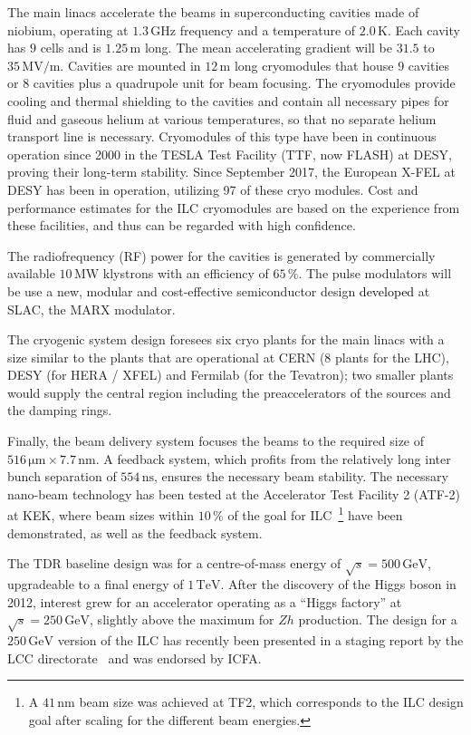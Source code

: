 \documentclass[%
 reprint,
 amsmath,amssymb,
 aps,
]{revtex4-1}
\newcommand{\jim}[1]{\textcolor{black}{#1}}
\begin{document}
The main linacs accelerate the beams in superconducting cavities made of niobium, operating at $1.3\,{\mathrm{GHz}}$ frequency and a temperature of $2.0\,{\mathrm{K}}$. 
Each cavity has $9$ cells and is $1.25\,{\mathrm{m}}$ long. The mean accelerating gradient will be $31.5$ to $35\,{\mathrm{MV/m}}$.
Cavities are mounted in $12\,{\mathrm{m}}$ long cryomodules that house $9$ cavities or $8$ cavities plus a quadrupole unit for beam focusing. 
The cryomodules provide cooling and thermal shielding to the cavities and contain all necessary pipes for fluid and gaseous helium at various temperatures, so that no separate helium transport line is necessary.
Cryomodules of this type have been in continuous operation since 2000 in the TESLA Test Facility (TTF, now FLASH) at DESY,  proving their long-term stability. 
Since September 2017, the European X-FEL at DESY has been in operation, utilizing 97 of these cryo modules. 
Cost and performance estimates for the ILC cryomodules are based on the experience from these facilities, and thus can be regarded with high confidence. 

The radiofrequency (RF) power for the cavities is generated by commercially available $10\,{\mathrm{MW}}$ klystrons with an efficiency of $65\,\%$. 
The pulse modulators will be use a new, modular and cost-effective semiconductor design \jim{developed} at SLAC, the MARX modulator.

The cryogenic system design foresees six cryo plants for the main linacs with a size similar to the plants that are operational at CERN (8 plants for the LHC), DESY (for HERA / XFEL) and Fermilab (for the Tevatron); 
two smaller plants would supply the central region including the preaccelerators of the sources and the damping rings. 

Finally, the beam delivery system focuses the beams to the required size of $516\,{\mathrm{\mu m}} \times 7.7\,{\mathrm{nm}} $. 
A feedback system, which profits from the relatively long inter bunch separation of $554\,{\mathrm{ns}}$, ensures the necessary beam stability. 
The necessary nano-beam technology has been tested at the Accelerator Test Facility 2 (ATF-2) at KEK, where beam sizes within $10\,\%$ of the goal for ILC~\footnote{A $41\,{\mathrm{nm}}$ beam size was achieved at TF2, which corresponds to the ILC design goal after scaling for the different beam energies.} have been demonstrated, as well as the feedback system.

The TDR baseline design was for a centre-of-mass energy of $\sqrt{s}=500\,{\mathrm{GeV}}$, upgradeable to a final energy of $1\,{\mathrm{TeV}}$.
After the discovery of the Higgs boson in 2012, interest grew for an accelerator operating as a ``Higgs factory'' at $\sqrt{s}=250\,{\mathrm{GeV}}$, slightly above the maximum for $Zh$ production. 
The design for a $250\,{\mathrm{GeV}}$ version of the ILC has recently been presented in a  staging report by the LCC directorate~\cite{Evans:2017rvt} and was endorsed by ICFA.
\end{document}
